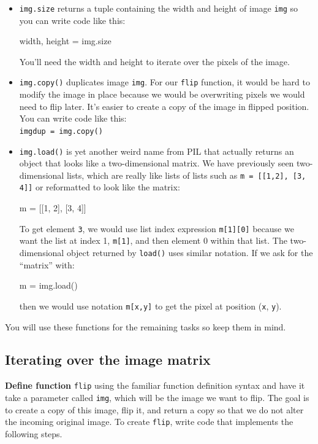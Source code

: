 \documentclass[titlepage]{tufte-book}
\begin{document}
\begin{itemize}
\item {\tt img.size} returns a tuple containing the width and height of image {\tt img} so you can write code like this:
\begin{pyverbatim}
width, height = img.size
\end{pyverbatim}
You'll need the width and height to iterate over the pixels of the image.

\item {\tt img.copy()} duplicates image {\tt img}.  For our {\tt flip} function, it would be hard to modify the image in place because we would be overwriting pixels we would need to flip later. It's easier to create a copy of the image in flipped position. You can write code like this:\\
{\tt imgdup = img.copy()}

\item {\tt img.load()} is yet another weird name from PIL that actually returns an object that looks like a two-dimensional matrix. We have previously seen two-dimensional lists, which are really like lists of lists such as {\tt m = [[1,2], [3, 4]]} or reformatted to look like the matrix:
\begin{pyverbatim}
m = [[1, 2],
     [3, 4]]
\end{pyverbatim}
To get element {\tt 3}, we would use list index expression {\tt m[1][0]} because we want the list at index 1, {\tt m[1]}, and then element 0 within that list. The two-dimensional object returned by {\tt load()} uses similar notation. If we ask for the ``matrix'' with:
\begin{pyverbatim}
m = img.load()
\end{pyverbatim}
then we would use notation {\tt m[x,y]} to get the pixel at position ({\tt x}, {\tt y}).
\end{itemize}

You will use these functions for the remaining tasks so keep them in mind.

\subsection{Iterating over the image matrix}

{\bf Define function} {\tt flip} using the familiar function definition syntax and have it take a parameter called {\tt img}, which will be the image we want to flip. The goal is to create a copy of this image, flip it, and return a copy so that we do not alter the incoming original image. To create {\tt flip}, write code that implements the following steps.
\end{document}
